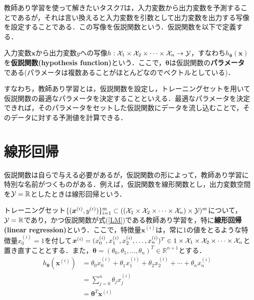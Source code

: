 教師あり学習を使って解きたいタスク$T$は，入力変数から出力変数を予測することであるが，それは言い換えると入力変数を引数として出力変数を出力する写像を設定することである．この写像を仮説関数という．仮説関数を以下で定義する．

\begin{defi}[仮説関数]
入力変数${\bm x}$から出力変数$y$への写像$h:{\cal X}_1 \times {\cal X}_2\times \cdots \times{\cal X}_n \to {\cal Y}$，すなわち$h_{\bm \theta}({\bm x})$を{\bf 仮説関数(hypothesis function)}という．ここで，${\bm \theta}$は仮説関数の{\bf パラメータ}である(パラメータは複数あることがほとんどなのでベクトルとしている)．
\end{defi}

すなわち，教師あり学習とは，仮説関数を設定し，トレーニングセットを用いて仮説関数の最適なパラメータを決定することといえる．最適なパラメータを決定できれば，そのパラメータをセットした仮説関数にデータを流し込むことで，そのデータに対する予測値を計算できる．

\section{線形回帰}

仮説関数は自らで与える必要があるが，仮説関数の形によって，教師あり学習に特別な名前がつくものがある．例えば，仮説関数を線形関数とし，出力変数空間を${\cal Y}=\mathbb{R}$としたときは線形回帰という．

\begin{defi}[線形回帰]
トレーニングセット$\{({\bm x}^{(i)},y^{(i)})\}_{i=1}^m \subset (({\cal X}_1 \times {\cal X}_2\times \cdots \times{\cal X}_n) \times {\cal Y})^m$について，${\cal Y}=\mathbb{R}$であり，かつ仮説関数が式(\ref{LM})である教師あり学習を，特に{\bf 線形回帰(linear regression)}という．ここで，特徴量${\bm x}^{(i)}$は，常に1の値をとるような特徴量$x_0^{(i)}=1$を付して${\bm x}^{(i)}=(x_0^{(i)},x_1^{(i)},x_2^{(i)},\ldots,x_n^{(i)})^T \in 1 \times {\cal X}_1 \times {\cal X}_2\times \cdots \times{\cal X}_n$と置き直すこととする．また，${\bm \theta}=(\theta_0,\theta_1,\ldots,\theta_n)^T \in \mathbb{R}^{n+1}$とする．
\begin{align}
h_{{\bm \theta}}({\bm x}^{(i)}) &= \theta_0 x_0^{(i)}+\theta_1 x_1^{(i)} +\theta_2 x_2^{(i)}+\cdots + \theta_n x_n^{(i)} \nonumber \\
&= \sum_{j=0}^n \theta_j x_j^{(i)}\nonumber \\
&= {\bm \theta}^T {\bm x}^{(i)} \label{LM}
\end{align}
\end{defi}

